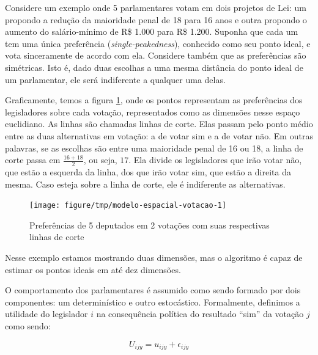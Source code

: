 \documentclass[a4paper,titlepage]{ppgi}\usepackage[]{graphicx}\usepackage[]{color}
\newenvironment{knitrout}{}{} %
\begin{document}
Considere um exemplo onde 5 parlamentares votam em
dois projetos de Lei: um propondo a redução da maioridade penal de
18 para 16 anos e outra
propondo o aumento do salário-mínimo de R\$ 1.000 para
R\$ 1.200. Suponha que cada um tem uma única preferência
(\emph{single-peakedness}), conhecido como seu ponto ideal, e vota sinceramente
de acordo com ela. Considere também que as preferências são simétricas. Isto é,
dado duas escolhas a uma mesma distância do ponto ideal de um parlamentar, ele
será indiferente a qualquer uma delas.

Graficamente, temos a figura \ref{fig:modelo-espacial-votacao}, onde os pontos
representam as preferências dos legisladores sobre cada votação, representados
como as dimensões nesse espaço euclidiano. As linhas são chamadas linhas de
corte. Elas passam pelo ponto médio entre as duas alternativas em votação: a de
votar sim e a de votar não. Em outras palavras, se as escolhas são entre uma
maioridade penal de 16 ou
18, a linha de corte passa em $\frac{16 + 18}{2}$,
ou seja, $17$. Ela divide os legisladores que irão votar não, que estão a
esquerda da linha, dos que irão votar sim, que estão a direita da mesma. Caso
esteja sobre a linha de corte, ele é indiferente as alternativas.

\begin{knitrout}
\color{fgcolor}\begin{figure}
\texttt{[image: figure/tmp/modelo-espacial-votacao-1]} \caption[Preferências de 5 deputados em 2 votações com suas respectivas linhas de corte]{Preferências de 5 deputados em 2 votações com suas respectivas linhas de corte}\label{fig:modelo-espacial-votacao}
\end{figure}


\end{knitrout}

Nesse exemplo estamos mostrando duas dimensões, mas o algoritmo é capaz de
estimar os pontos ideais em até dez dimensões.


O comportamento dos parlamentares é assumido como sendo formado por dois
componentes: um determinístico e outro estocástico. Formalmente, definimos a
utilidade do legislador $i$ na consequência política do resultado ``sim'' da
votação $j$ como sendo:

\begin{equation}
  U_{ijy} = u_{ijy} + \epsilon_{ijy}
\end{equation}
\end{document}
